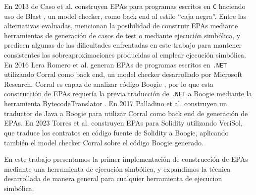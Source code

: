 En 2013 de Caso et al. \cite{de-caso-epa} construyen EPAs para programas escritos en \texttt{C} haciendo uso de Blast \cite{blast}, un model checker, como back end al estilo ``caja negra''.
Entre las alternativas evaluadas, mencionan la posibilidad de construir EPAs mediante herramientas de generación de casos de test o mediante ejecución simbólica, y predicen algunas de las dificultades enfrentadas en este trabajo para mantener consistentes las sobreaproximaciones producidas al emplear ejecución simbólica.
En 2016 Lera Romero et al. \cite{lera-romero-tesis} generan EPAs de programas escritos en \texttt{.NET} utilizando Corral \cite{corral} como back end, un model checker desarrollado por Microsoft Research.
Corral es capaz de analizar código Boogie \cite{boogie}, por lo que esta construcción de EPAs requería la previa traducción de \texttt{.NET} a Boogie mediante la herramienta BytecodeTranslator \cite{bytecodetranslator}.
En 2017 Palladino et al. \cite{paladino-tesis} construyen un traductor de Java a Boogie para utilizar Corral como back end de generación de EPAs.
En 2023 Torres et al. \cite{torres} construyen EPAs para Solidity utilizando VeriSol, que traduce los contratos en código fuente de Solidity a Boogie, aplicando también el model checker Corral sobre el código Boogie generado.

En este trabajo presentamos la primer implementación de construcción de EPAs mediante una herramienta de ejecución simbólica, y expandimos la técnica desarrollada de manera general para cualquier herramienta de ejecucion simbólica.
